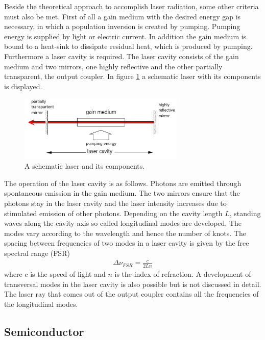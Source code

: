 Beside the theoretical approach to
accomplish laser radiation, some other criteria
must also be met.
First of all a gain medium with the desired
energy gap is necessary, in which
a population inversion is created by pumping.
Pumping energy is supplied by light or electric current.
In addition the gain medium is bound to a heat-sink
to dissipate residual heat, which is produced by pumping.
Furthermore a laser cavity is required.
The laser cavity consists of the gain medium and two
mirrors, one highly reflective and the other
partially transparent,
the output coupler.
In figure \ref{fig:laserschema}
a schematic laser with its components is displayed.
\begin{figure}
\centering
\includegraphics[width=0.7\textwidth]{laserkonzept.png}
\caption{A schematic laser and its components.
\cite{wiki_diode}}
\label{fig:laserschema}
\end{figure}
The operation of the laser cavity is as follows.
Photons are emitted through spontaneous emission
in the gain medium. The two mirrors
ensure that the photons stay in the laser cavity
and the laser intensity increases due to
stimulated emission of other photons.
Depending on the cavity length $L$,
standing waves along the cavity axis so called longitudinal modes
are developed.
The modes vary according to the wavelength and hence
the number of knots. The spacing
between frequencies of two modes in a laser
cavity is given by the free spectral range (FSR)
\begin{align}
\Delta \nu_{FSR} = \frac{c}{2Ln}
\end{align}
where $c$ is the speed of light and $n$ is
the index of refraction.
A development of transversal modes in the laser cavity
is also possible but is not discussed in detail.
The laser ray that comes out of the output coupler
contains all the frequencies of the longitudinal modes.

\subsection{Semiconductor}
\label{subsec:Semiconductor}

